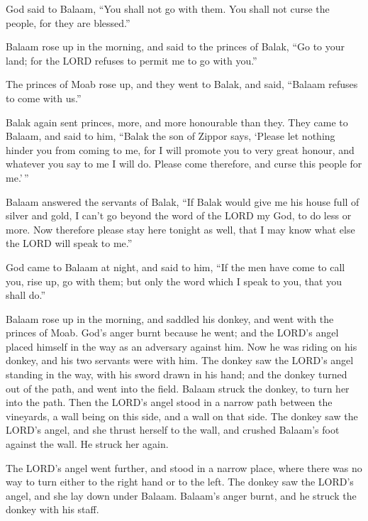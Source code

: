  God said to Balaam, ``You shall not go with them. You
shall not curse the people, for they are blessed.''

 Balaam rose up in the morning, and said to the princes of
Balak, ``Go to your land; for the LORD refuses to permit me to go with
you.''

 The princes of Moab rose up, and they went to Balak, and
said, ``Balaam refuses to come with us.''

 Balak again sent princes, more, and more honourable than
they.  They came to Balaam, and said to him, ``Balak the
son of Zippor says, `Please let nothing hinder you from coming to me,
 for I will promote you to very great honour, and whatever
you say to me I will do. Please come therefore, and curse this people
for me.'\,''

 Balaam answered the servants of Balak, ``If Balak would
give me his house full of silver and gold, I can't go beyond the word of
the LORD my God, to do less or more.  Now therefore please
stay here tonight as well, that I may know what else the LORD will speak
to me.''

 God came to Balaam at night, and said to him, ``If the men
have come to call you, rise up, go with them; but only the word which I
speak to you, that you shall do.''

 Balaam rose up in the morning, and saddled his donkey, and
went with the princes of Moab.  God's anger burnt because
he went; and the LORD's angel placed himself in the way as an adversary
against him. Now he was riding on his donkey, and his two servants were
with him.  The donkey saw the LORD's angel standing in the
way, with his sword drawn in his hand; and the donkey turned out of the
path, and went into the field. Balaam struck the donkey, to turn her
into the path.  Then the LORD's angel stood in a narrow
path between the vineyards, a wall being on this side, and a wall on
that side.  The donkey saw the LORD's angel, and she thrust
herself to the wall, and crushed Balaam's foot against the wall. He
struck her again.

 The LORD's angel went further, and stood in a narrow
place, where there was no way to turn either to the right hand or to the
left.  The donkey saw the LORD's angel, and she lay down
under Balaam. Balaam's anger burnt, and he struck the donkey with his
staff.

